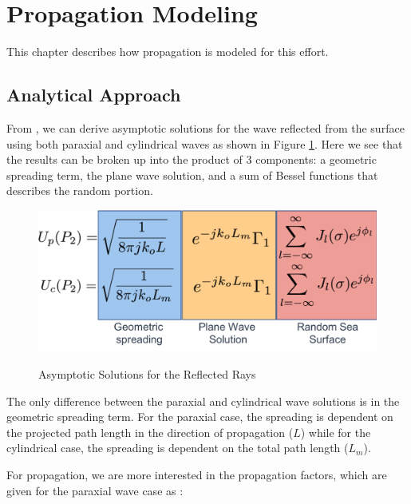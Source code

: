 \renewcommand{\baselinestretch}{2} \small\normalsize
\section{Propagation Modeling}
This chapter describes how propagation is modeled for this effort.

\subsection{Analytical Approach}
From \cite{frazier_green}, we can derive asymptotic solutions for the wave reflected from the surface using both paraxial and cylindrical waves as shown in Figure \ref{prop_fig:0}. Here we see that the results can be broken up into the product of 3 components: a geometric spreading term, the plane wave solution, and a sum of Bessel functions that describes the random portion. 

\begin{figure}[H]
  \begin{center}
\includegraphics[width=5in]{../media/multistatic/analytical_solutions.png}
  \end{center}
  \renewcommand{\baselinestretch}{1} \small\normalsize
  \begin{quote}
    \caption[Asymptotic Solutions for the Reflected Rays]{Asymptotic Solutions for the Reflected Rays\label{prop_fig:0}}
  \end{quote}
\end{figure}
\renewcommand{\baselinestretch}{2} \small\normalsize

The only difference between the paraxial and cylindrical wave solutions is in the geometric spreading term. For the paraxial case, the spreading is dependent on the projected path length in the direction of propagation ($L$) while for the cylindrical case, the spreading is dependent on the total path length ($L_m$). 

For propagation, we are more interested in the propagation factors, which are given for the paraxial wave case as \cite{frazier_green}:

